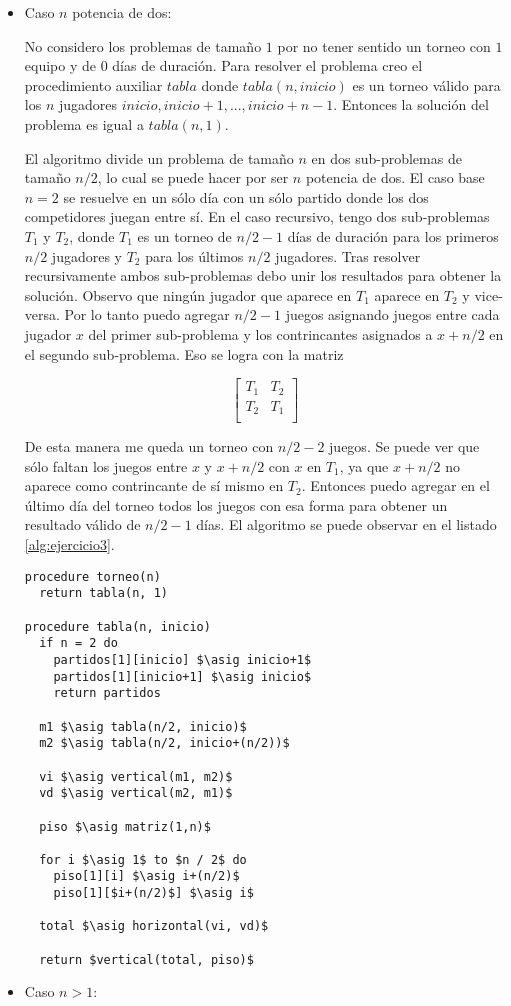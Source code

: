 \documentclass{article}
\newcommand{\asig}{\ensuremath{\leftarrow}}
\begin{document}
\begin{itemize}

\item Caso $n$ potencia de dos:

No considero los problemas de tamaño $1$ por no tener sentido un torneo con $1$ equipo y de $0$
días de duración. Para resolver el problema creo el procedimiento auxiliar $tabla$ donde
$tabla(n, inicio)$ es un torneo válido para los $n$ jugadores $inicio, inicio+1, ..., inicio+n-1$.
Entonces la solución del problema es igual a $tabla(n, 1)$.

El algoritmo divide un problema de tamaño $n$ en dos sub-problemas
de tamaño $n/2$, lo cual se puede hacer por ser $n$ potencia de dos. El caso base $n = 2$
se resuelve en un sólo día con un sólo partido donde los dos competidores juegan entre sí.
En el caso recursivo, tengo dos sub-problemas $T_1$ y $T_2$, donde $T_1$ es un torneo de $n/2-1$ días
de duración para los primeros $n/2$ jugadores y $T_2$ para los últimos $n/2$ jugadores. Tras resolver
recursivamente ambos sub-problemas debo unir los resultados para obtener la solución. Observo que ningún
jugador que aparece en $T_1$ aparece en $T_2$ y vice-versa. Por lo tanto puedo agregar $n/2-1$ juegos
asignando juegos entre cada jugador $x$ del primer sub-problema y los contrincantes asignados a $x+n/2$
en el segundo sub-problema. Eso se logra con la matriz

$$
\left[
\begin{array}{cc}
T_1 & T_2 \\
T_2 & T_1 \\
\end{array}
\right]
$$

De esta manera me queda un torneo con $n/2-2$ juegos. Se puede ver que sólo faltan los juegos
entre $x$ y $x+n/2$ con $x$ en $T_1$, ya que $x+n/2$ no aparece como contrincante de sí mismo
en $T_2$. Entonces puedo agregar en el último día del torneo todos los juegos con esa forma para
obtener un resultado válido de $n/2-1$ días. El algoritmo se puede observar en el listado
\ref{alg:ejercicio3}.

\begin{lstlisting}[float,caption={Solución al ejercicio 3},label=alg:ejercicio3]
procedure torneo(n)
  return tabla(n, 1)

procedure tabla(n, inicio)
  if n = 2 do
    partidos[1][inicio] $\asig inicio+1$
    partidos[1][inicio+1] $\asig inicio$
    return partidos

  m1 $\asig tabla(n/2, inicio)$
  m2 $\asig tabla(n/2, inicio+(n/2))$

  vi $\asig vertical(m1, m2)$
  vd $\asig vertical(m2, m1)$

  piso $\asig matriz(1,n)$

  for i $\asig 1$ to $n / 2$ do
    piso[1][i] $\asig i+(n/2)$
    piso[1][$i+(n/2)$] $\asig i$

  total $\asig horizontal(vi, vd)$

  return $vertical(total, piso)$
\end{lstlisting}

\item Caso $n > 1$:

\end{itemize}
\end{document}
